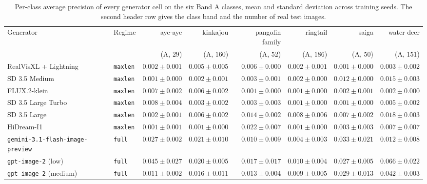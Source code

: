 \begin{table}[p]
\centering
\footnotesize
{}
\setlength{\tabcolsep}{4pt}
\caption[Per-class average precision, rare classes]{Per-class average precision of every generator cell on the six Band A classes, mean and standard deviation across training seeds. The second header row gives the class band and the number of real test images.}
\label{tab:appendix-per-class-ap-rare}
\begin{adjustbox}{max width=\textwidth}
\begin{tabular}{@{}llrrrrrr@{}}
    \toprule
    Generator & Regime & aye-aye & kinkajou & pangolin family & ringtail & saiga & water deer \\
     & & (A, $29$) & (A, $160$) & (A, $52$) & (A, $186$) & (A, $50$) & (A, $151$) \\
    \midrule
    RealVisXL + Lightning & \texttt{maxlen} & $0.002 \pm 0.001$ & $0.005 \pm 0.005$ & $0.006 \pm 0.000$ & $0.002 \pm 0.001$ & $0.001 \pm 0.000$ & $0.003 \pm 0.002$ \\
    SD 3.5 Medium & \texttt{maxlen} & $0.001 \pm 0.000$ & $0.002 \pm 0.001$ & $0.003 \pm 0.001$ & $0.002 \pm 0.000$ & $0.012 \pm 0.000$ & $0.015 \pm 0.003$ \\
    FLUX.2-klein & \texttt{maxlen} & $0.007 \pm 0.002$ & $0.006 \pm 0.002$ & $0.001 \pm 0.000$ & $0.001 \pm 0.000$ & $0.002 \pm 0.001$ & $0.002 \pm 0.000$ \\
    SD 3.5 Large Turbo & \texttt{maxlen} & $0.008 \pm 0.004$ & $0.003 \pm 0.002$ & $0.003 \pm 0.003$ & $0.001 \pm 0.000$ & $0.001 \pm 0.000$ & $0.005 \pm 0.002$ \\
    SD 3.5 Large & \texttt{maxlen} & $0.002 \pm 0.001$ & $0.006 \pm 0.002$ & $0.014 \pm 0.002$ & $0.008 \pm 0.006$ & $0.007 \pm 0.002$ & $0.018 \pm 0.003$ \\
    HiDream-I1 & \texttt{maxlen} & $0.001 \pm 0.001$ & $0.001 \pm 0.000$ & $0.022 \pm 0.007$ & $0.001 \pm 0.000$ & $0.003 \pm 0.003$ & $0.007 \pm 0.007$ \\
    \midrule
    \texttt{gemini-3.1-flash-image-preview} & \texttt{full} & $0.027 \pm 0.002$ & $0.021 \pm 0.010$ & $0.010 \pm 0.009$ & $0.004 \pm 0.003$ & $0.033 \pm 0.021$ & $0.012 \pm 0.008$ \\
    \texttt{gpt-image-2} (low) & \texttt{full} & $0.045 \pm 0.027$ & $0.020 \pm 0.005$ & $0.017 \pm 0.017$ & $0.010 \pm 0.004$ & $0.027 \pm 0.005$ & $0.066 \pm 0.022$ \\
    \texttt{gpt-image-2} (medium) & \texttt{full} & $0.011 \pm 0.002$ & $0.016 \pm 0.011$ & $0.013 \pm 0.004$ & $0.009 \pm 0.005$ & $0.029 \pm 0.013$ & $0.042 \pm 0.003$ \\

\end{tabular}
\end{adjustbox}
\end{table}
